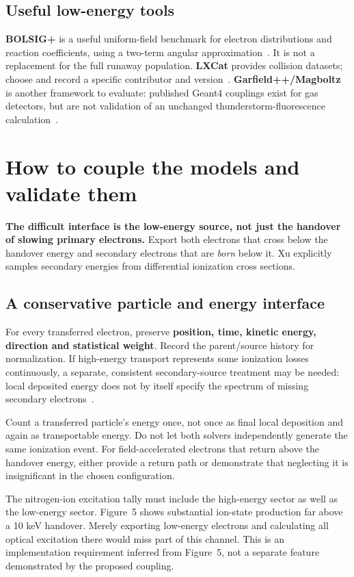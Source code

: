 \documentclass[11pt,a4paper]{article}
\newcommand{\xu}[1]{\cite[#1]{Xu2015}}
\newcommand{\nextsection}[1]{\clearpage\section{#1}}
\begin{document}
\subsection*{Useful low-energy tools}
\textbf{BOLSIG+} is a useful uniform-field benchmark for electron distributions and reaction coefficients, using a two-term angular approximation~\cite{BOLSIG}. It is not a replacement for the full runaway population. \textbf{LXCat} provides collision datasets; choose and record a specific contributor and version~\cite{LXCat}. \textbf{Garfield++/Magboltz} is another framework to evaluate: published Geant4 couplings exist for gas detectors, but are not validation of an unchanged thunderstorm-fluorescence calculation~\cite{Pfeiffer2019}.

\nextsection{How to couple the models and validate them}
\label{sec:coupling}
\textbf{The difficult interface is the low-energy source, not just the handover of slowing primary electrons.} Export both electrons that cross below the handover energy and secondary electrons that are \emph{born} below it. Xu explicitly samples secondary energies from differential ionization cross sections.\xu{Sec.~2.1}

\subsection*{A conservative particle and energy interface}
For every transferred electron, preserve \textbf{position, time, kinetic energy, direction and statistical weight}. Record the parent/source history for normalization. If high-energy transport represents some ionization losses continuously, a separate, consistent secondary-source treatment may be needed: local deposited energy does not by itself specify the spectrum of missing secondary electrons~\cite{G4Cuts}.

Count a transferred particle's energy once, not once as final local deposition and again as transportable energy. Do not let both solvers independently generate the same ionization event. For field-accelerated electrons that return above the handover energy, either provide a return path or demonstrate that neglecting it is insignificant in the chosen configuration.

\begin{keybox}
The nitrogen-ion excitation tally must include the high-energy sector as well as the low-energy sector. Figure~5 shows substantial ion-state production far above a 10 keV handover. Merely exporting low-energy electrons and calculating all optical excitation there would miss part of this channel. This is an implementation requirement inferred from Figure~5, not a separate feature demonstrated by the proposed coupling.\xu{Fig.~5(b)}
\end{keybox}
\end{document}
